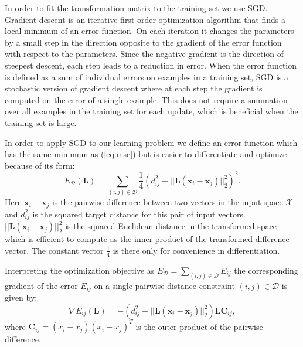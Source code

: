 \documentclass[a4paper,titlepage]{article}
\renewcommand{\vec}[1]{\mathbf{#1}}
\newcommand{\mat}[1]{\mathbf{#1}}
\begin{document}
In order to fit the transformation matrix to the training set we use \acf{SGD}. Gradient descent is an iterative first order optimization algorithm that finds a local minimum of an error function. On each iteration it changes the parameters by a small step in the direction opposite to the gradient of the error function with respect to the parameters. Since the negative gradient is the direction of steepest descent, each step leads to a reduction in error. When the error function is defined as a sum of individual errors on examples in a training set, \ac{SGD} is a stochastic version of gradient descent where at each step the gradient is computed on the error of a single example. This does not require a summation over all examples in the training set for each update, which is beneficial when the training set is large. 

In order to apply \ac{SGD} to our learning problem we define an error function which has the same minimum as (\ref{eq:mse}) but is easier to differentiate and optimize because of its form:
\begin{equation}
E_{\mathcal{D}}(\mat{L}) =  \sum_{(i,j) \in \mathcal{D}}  \frac{1}{4} \left ( d_{ij}^2 - ||\mat{L}(\vec{x}_i - \vec{x}_j)||_2^2 \right )^2.
\label{eq:opt_target}
\end{equation}
Here $\vec{x}_i - \vec{x}_j$ is the pairwise difference between two vectors in the input space $\mathcal{X}$ and $d_{ij}^2$ is the squared target distance for this pair of input vectors. $||\mat{L}(\vec{x}_i - \vec{x}_j)||_2^2$ is the squared Euclidean distance in the transformed space which is efficient to compute as the inner product of the transformed difference vector. The constant vector $\frac{1}{4}$ is there only for convenience in differentiation. 

Interpreting the optimization objective as $E_{\mathcal{D}} = \sum_{(i,j)\in\mathcal{D}} E_{ij}$ the corresponding gradient of the error $E_{ij}$ on a single pairwise distance constraint $(i,j) \in \mathcal{D}$ is given by:
\begin{equation}
\nabla E_{ij}(\mat{L})  = - \left ( d_{ij}^2 - ||\mat{L}(\vec{x}_i - \vec{x}_j)||_2^2 \right) \mat{L} \mat{C}_{ij},
\label{eq:opt_grad}
\end{equation}
where $\mat{C}_{ij} = (x_i - x_j)(x_i - x_j)^T$ is the outer product of the pairwise difference.
\end{document}

